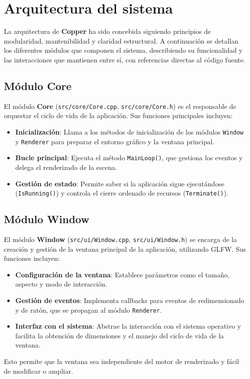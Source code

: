 \chapter{Arquitectura del sistema}

La arquitectura de \textbf{Copper} ha sido concebida siguiendo principios de
modularidad, mantenibilidad y claridad estructural. A continuación se detallan
los diferentes módulos que componen el sistema, describiendo su funcionalidad y
las interacciones que mantienen entre sí, con referencias directas al código
fuente.

\section{Módulo Core}

El módulo \textbf{Core} (\texttt{src/core/Core.cpp}, \texttt{src/core/Core.h})
es el responsable de orquestar el ciclo de vida de la aplicación. Sus funciones
principales incluyen:
\begin{itemize}
    \item \textbf{Inicialización}: Llama a los métodos de inicialización de los módulos \texttt{Window} y \texttt{Renderer} para preparar el entorno gráfico y la ventana principal.
    \item \textbf{Bucle principal}: Ejecuta el método \texttt{MainLoop()}, que gestiona los eventos y delega el renderizado de la escena.
    \item \textbf{Gestión de estado}: Permite saber si la aplicación sigue ejecutándose (\texttt{IsRunning()}) y controla el cierre ordenado de recursos (\texttt{Terminate()}).
\end{itemize}

\section{Módulo Window}

El módulo \textbf{Window} (\texttt{src/ui/Window.cpp},
\texttt{src/ui/Window.h}) se encarga de la creación y gestión de la ventana
principal de la aplicación, utilizando GLFW. Sus funciones incluyen:
\begin{itemize}
    \item \textbf{Configuración de la ventana}: Establece parámetros como el tamaño, aspecto y modo de interacción.
    \item \textbf{Gestión de eventos}: Implementa callbacks para eventos de redimensionado y de ratón, que se propagan al módulo \texttt{Renderer}.
    \item \textbf{Interfaz con el sistema}: Abstrae la interacción con el sistema operativo y facilita la obtención de dimensiones y el manejo del ciclo de vida de la ventana.
\end{itemize}
Esto permite que la ventana sea independiente del motor de renderizado y fácil de modificar o ampliar.

